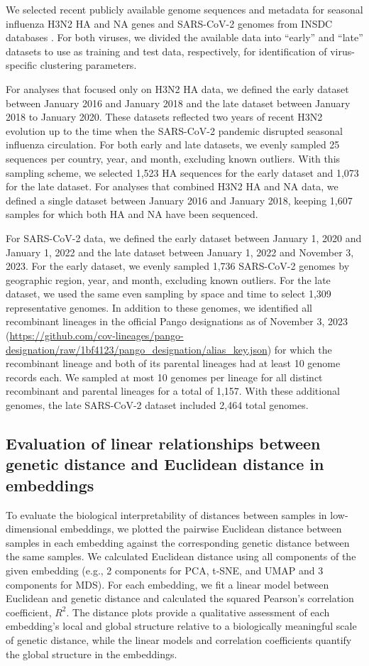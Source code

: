 \documentclass[10pt,letterpaper]{article}
\begin{document}
We selected recent publicly available genome sequences and metadata for seasonal influenza H3N2 HA and NA genes and SARS-CoV-2 genomes from INSDC databases \cite{Arita2021}.
For both viruses, we divided the available data into ``early'' and ``late'' datasets to use as training and test data, respectively, for identification of virus-specific clustering parameters.

For analyses that focused only on H3N2 HA data, we defined the early dataset between January 2016 and January 2018 and the late dataset between January 2018 to January 2020.
These datasets reflected two years of recent H3N2 evolution up to the time when the SARS-CoV-2 pandemic disrupted seasonal influenza circulation.
For both early and late datasets, we evenly sampled 25 sequences per country, year, and month, excluding known outliers.
With this sampling scheme, we selected 1,523 HA sequences for the early dataset and 1,073 for the late dataset.
For analyses that combined H3N2 HA and NA data, we defined a single dataset between January 2016 and January 2018, keeping 1,607 samples for which both HA and NA have been sequenced.

For SARS-CoV-2 data, we defined the early dataset between January 1, 2020 and January 1, 2022 and the late dataset between January 1, 2022 and November 3, 2023.
For the early dataset, we evenly sampled 1,736 SARS-CoV-2 genomes by geographic region, year, and month, excluding known outliers.
For the late dataset, we used the same even sampling by space and time to select 1,309 representative genomes.
In addition to these genomes, we identified all recombinant lineages in the official Pango designations as of November 3, 2023 (\url{https://github.com/cov-lineages/pango-designation/raw/1bf4123/pango_designation/alias_key.json}) for which the recombinant lineage and both of its parental lineages had at least 10 genome records each.
We sampled at most 10 genomes per lineage for all distinct recombinant and parental lineages for a total of 1,157.
With these additional genomes, the late SARS-CoV-2 dataset included 2,464 total genomes.

\subsection*{Evaluation of linear relationships between genetic distance and Euclidean distance in embeddings}

To evaluate the biological interpretability of distances between samples in low-dimensional embeddings, we plotted the pairwise Euclidean distance between samples in each embedding against the corresponding genetic distance between the same samples.
We calculated Euclidean distance using all components of the given embedding (e.g., 2 components for PCA, t-SNE, and UMAP and 3 components for MDS).
For each embedding, we fit a linear model between Euclidean and genetic distance and calculated the squared Pearson's correlation coefficient, $R^{2}$.
The distance plots provide a qualitative assessment of each embedding's local and global structure relative to a biologically meaningful scale of genetic distance, while the linear models and correlation coefficients quantify the global structure in the embeddings.
\end{document}
